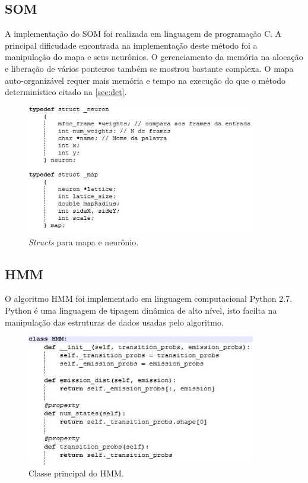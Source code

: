 \subsection{SOM}
\label{sec:som}
\quad A implementação do SOM  foi realizada em linguagem de programação C. A principal dificudade encontrada na implementação deste método foi a manipulação do mapa e seus neurônios. O gerenciamento da memória na alocação e liberação de vários ponteiros também se mostrou bastante complexa. O mapa auto-organizável requer  mais memória e tempo na execução do que o método determinístico citado na \ref{sec:det}.


\begin{figure}[H]
\centering %
\includegraphics[width=10cm]{img/structneuron.jpg} %
\caption{\textit{Structs} para mapa e neurônio.}
\label{fig:strneu}
\end{figure}



\subsection{HMM}
\label{sec:hmm}
\quad O algoritmo HMM foi implementado em linguagem computacional Python 2.7. Python é uma linguagem de tipagem dinâmica de alto nível, isto facilta na manipulação das estruturas de dados usadas pelo algoritmo.


\begin{figure}[H]
\centering %
\includegraphics[width=10cm]{img/classhmm.jpg} %
\caption{Classe principal do HMM.}
\label{fig:classhmm}
\end{figure}

